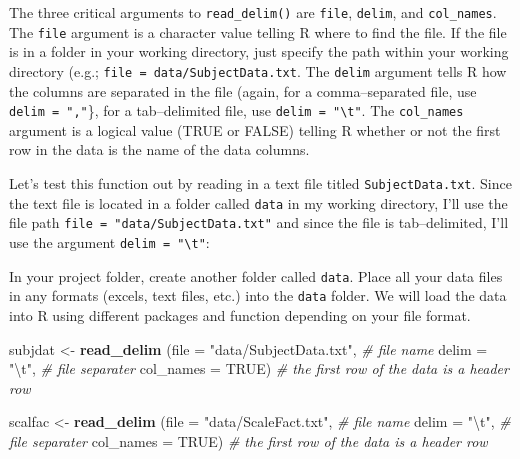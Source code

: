 \documentclass[
]{book}
\newenvironment{Shaded}{\begin{snugshade}}{\end{snugshade}}
\newcommand{\CharTok}[1]{\textcolor[rgb]{0.31,0.60,0.02}{#1}}
\newcommand{\CommentTok}[1]{\textcolor[rgb]{0.56,0.35,0.01}{\textit{#1}}}
\newcommand{\DataTypeTok}[1]{\textcolor[rgb]{0.13,0.29,0.53}{#1}}
\newcommand{\KeywordTok}[1]{\textcolor[rgb]{0.13,0.29,0.53}{\textbf{#1}}}
\newcommand{\NormalTok}[1]{#1}
\newcommand{\OtherTok}[1]{\textcolor[rgb]{0.56,0.35,0.01}{#1}}
\newcommand{\StringTok}[1]{\textcolor[rgb]{0.31,0.60,0.02}{#1}}
\begin{document}
The three critical arguments to \texttt{read\_delim()} are \texttt{file}, \texttt{delim}, and \texttt{col\_names}. The \texttt{file} argument is a character value telling R where to find the file. If the file is in a folder in your working directory, just specify the path within your working directory (e.g.; \texttt{file\ =\ data/SubjectData.txt}. The \texttt{delim} argument tells R how the columns are separated in the file (again, for a comma--separated file, use \texttt{delim\ =\ ","}\}, for a tab--delimited file, use \texttt{delim\ =\ "\textbackslash{}t"}. The \texttt{col\_names} argument is a logical value (TRUE or FALSE) telling R whether or not the first row in the data is the name of the data columns.

Let's test this function out by reading in a text file titled \texttt{SubjectData.txt}. Since the text file is located in a folder called \texttt{data} in my working directory, I'll use the file path \texttt{file\ =\ "data/SubjectData.txt"} and since the file is tab--delimited, I'll use the argument \texttt{delim\ =\ "\textbackslash{}t"}:

In your project folder, create another folder called \texttt{data}. Place all your data files in any formats (excels, text files, etc.) into the \texttt{data} folder. We will load the data into R using different packages and function depending on your file format.

\begin{Shaded}
\begin{Highlighting}[]
\NormalTok{subjdat <-}\StringTok{  }\KeywordTok{read_delim}\NormalTok{ (}\DataTypeTok{file =} \StringTok{"data/SubjectData.txt"}\NormalTok{, }\CommentTok{# file name}
                        \DataTypeTok{delim =} \StringTok{"}\CharTok{\textbackslash{}t}\StringTok{"}\NormalTok{, }\CommentTok{# file separater}
                        \DataTypeTok{col_names =} \OtherTok{TRUE}\NormalTok{) }\CommentTok{# the first row of the data is a header row}

\NormalTok{scalfac <-}\StringTok{  }\KeywordTok{read_delim}\NormalTok{ (}\DataTypeTok{file =} \StringTok{"data/ScaleFact.txt"}\NormalTok{, }\CommentTok{# file name}
                        \DataTypeTok{delim =} \StringTok{"}\CharTok{\textbackslash{}t}\StringTok{"}\NormalTok{, }\CommentTok{# file separater}
                        \DataTypeTok{col_names =} \OtherTok{TRUE}\NormalTok{) }\CommentTok{# the first row of the data is a header row}
\end{Highlighting}
\end{Shaded}
\end{document}
